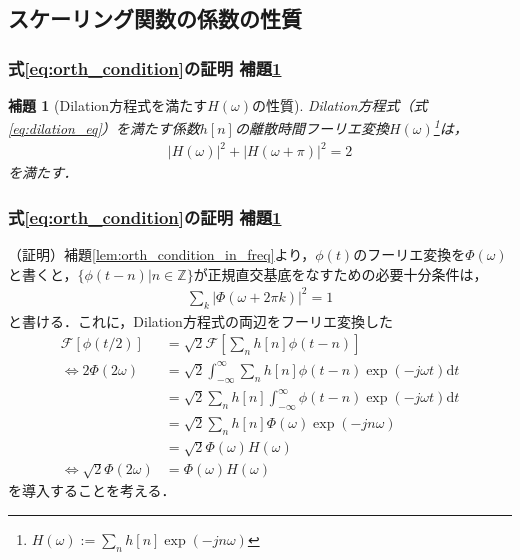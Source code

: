 \documentclass[dvipdfmx,graphicx,14pt]{beamer}
\newcommand{\ft}[1]{\mathcal{F}\left[ #1 \right]}
\newtheorem{mylemma}{補題}
\begin{document}
\subsection{スケーリング関数の係数の性質}

\begin{frame}[c]
    \frametitle{式\eqref{eq:orth_condition}の証明 補題\ref{lem:orth_condition_for_scaling_filter}}
    \begin{mylemma}[Dilation方程式を満たす$H(\omega)$の性質]
        Dilation方程式（式\eqref{eq:dilation_eq}）を満たす係数$h[n]$の離散時間フーリエ変換$H(\omega)$\footnote{$H(\omega) := \sum_{n} h[n] \exp(-jn\omega)$}は，
        \begin{align}
            |H(\omega)|^{2} + |H(\omega+\pi)|^{2} = 2 \label{eq:scaling_orth_condition_in_freq}
        \end{align}
        を満たす．
        \label{lem:orth_condition_for_scaling_filter}
    \end{mylemma}
\end{frame}

\begin{frame}[c]
    \frametitle{式\eqref{eq:orth_condition}の証明 補題\ref{lem:orth_condition_for_scaling_filter}}
    \scriptsize
    （証明）補題\ref{lem:orth_condition_in_freq}より，$\phi(t)$のフーリエ変換を$\Phi(\omega)$と書くと，$\{ \phi(t - n) | n \in \mathbb{Z} \}$が正規直交基底をなすための必要十分条件は，
    \begin{align}
        \sum_{k} | \Phi(\omega + 2\pi k)|^{2} = 1 \label{eq:scale_orth_condition_in_freq}
    \end{align}
    と書ける．これに，Dilation方程式の両辺をフーリエ変換した
    \begin{align}
        \ft{\phi(t/2)} &= \sqrt{2}\ft{\sum_{n} h[n] \phi(t - n)} \nonumber \\
        \iff 2\Phi(2\omega) &= \sqrt{2} \int_{-\infty}^{\infty} \sum_{n} h[n] \phi(t - n) \exp(-j\omega t) \mathrm{d} t  \nonumber \\
        &= \sqrt{2} \sum_{n} h[n] \int_{-\infty}^{\infty} \phi(t - n) \exp(-j\omega t) \mathrm{d} t  \nonumber \\
        &= \sqrt{2} \sum_{n} h[n] \Phi(\omega) \exp(-jn\omega) \nonumber \\
        &= \sqrt{2} \Phi(\omega) H(\omega) \nonumber \\
        \iff \sqrt{2} \Phi(2\omega) &= \Phi(\omega) H(\omega) \label{eq:dilation_eq_in_freq}
    \end{align}
    を導入することを考える．
\end{frame}
\end{document}
